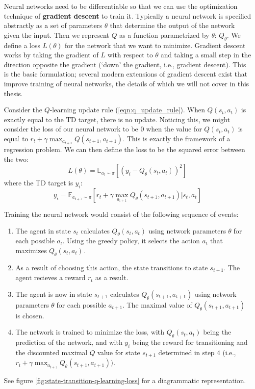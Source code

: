 \documentclass[journal, onecolumn, 12pt, draftclsnofoot]{IEEEtran}
\newcommand{\kword}[1]{\textbf{#1}}
\begin{document}
		\par Neural networks need to be differentiable so that we can use the optimization technique of \kword{gradient descent} to train it. Typically a neural network is specified abstractly as a set of parameters $\theta$ that determine the output of the network given the input. Then we represent $Q$ as a function parametrized by $\theta$: $Q_\theta$. We define a loss $L(\theta)$ for the network that we want to minimize. Gradient descent works by taking the gradient of $L$ with respect to $\theta$ and taking a small step in the direction opposite the gradient (`down' the gradient, i.e., gradient descent). This is the basic formulation; several modern extensions of gradient descent exist that improve training of neural networks, the details of which we will not cover in this thesis.
		\par Consider the $Q$-learning update rule (\ref{eqn:q_update_rule}). When $Q(s_t, a_t)$ is exactly equal to the TD target, there is no update. Noticing this, we might consider the loss of our neural network to be 0 when the value for $Q(s_t, a_t)$ is equal to $r_t + \gamma \max_{a_{t+1}} Q(s_{t+1}, a_{t+1})$. This is exactly the framework of a regression problem. We can then define the loss to be the squared error between the two:
		\begin{equation}
			\label{eqn:q_loss_no_target_network}
			L(\theta) = \mathbb{E}_{a_t \sim \pi}[(y_i - Q_\theta(s_t, a_t))^2]
		\end{equation}
		where the TD target is $y_i$:
		\begin{equation}
			\label{eqn:y_i_no_target_network}
			y_i = \mathbb{E}_{a_{t+1} \sim \pi} \left[ r_t + \gamma \max_{a_{t+1}}Q_\theta(s_{t+1}, a_{t+1}) \big\vert s_t, a_t \right]
		\end{equation}
		\par Training the neural network would consist of the following sequence of events:
		\begin{enumerate}
			\item The agent in state $s_t$ calculates $Q_\theta (s_t, a_t)$ using network parameters $\theta$ for each possible $a_t$. Using the greedy policy, it selects the action $a_t$ that maximizes $Q_\theta (s_t, a_t)$.
			\item As a result of choosing this action, the state transitions to state $s_{t+1}$. The agent recieves a reward $r_t$ as a result.
			\item The agent is now in state $s_{t+1}$ calculates $Q_\theta(s_{t+1}, a_{t+1})$ using network parameters $\theta$ for each possible $a_{t+1}$. The maximal value of $Q_\theta (s_{t+1}, a_{t+1})$ is chosen.
			\item The network is trained to minimize the loss, with $Q_\theta (s_t, a_t)$ being the prediction of the network, and with $y_i$ being the reward for transitioning and the discounted maximal $Q$ value for state $s_{t+1}$ determined in step $4$ (i.e., $r_t + \gamma \max_{a_{t+1}}Q_\theta (s_{t+1}, a_{t+1}))$.
		\end{enumerate}
		See figure \ref{fig:state-transition-q-learning-loss} for a diagrammatic representation.
\end{document}
